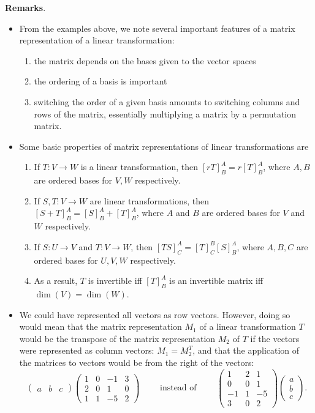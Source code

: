 \documentclass[12pt]{article}
\begin{document}
\textbf{Remarks}.  
\begin{itemize}
\item
From the examples above, we note several important features of a matrix representation of a linear transformation:
\begin{enumerate}
\item the matrix depends on the bases given to the vector spaces
\item the ordering of a basis is important
\item switching the order of a given basis amounts to switching columns and rows of the matrix, essentially multiplying a matrix by a permutation matrix.
\end{enumerate}
\item Some basic properties of matrix representations of linear transformations are
\begin{enumerate}
\item If $T:V\to W$ is a linear transformation, then $[rT]^A_B=r[T]^A_B$, where $A,B$ are ordered bases for $V,W$ respectively.
\item If $S,T:V\to W$ are linear transformations, then $[S+T]^A_B=[S]^A_B+[T]^A_B$, where $A$ and $B$ are ordered bases for $V$ and $W$ respectively.
\item If $S:U\to V$ and $T:V\to W$, then $[TS]^A_C=[T]^B_C[S]^A_B$, where $A,B,C$ are ordered bases for $U,V,W$ respectively.
\item As a result, $T$ is invertible iff $[T]^A_B$ is an invertible matrix iff $\dim(V)=\dim(W)$.
\end{enumerate}
\item
We could have represented all vectors as row vectors.  However, doing so would mean that the matrix representation $M_1$ of a linear transformation $T$ would be the transpose of the matrix representation $M_2$ of $T$ if the vectors were represented as column vectors: $M_1=M_2^T$, and that the application of the matrices to vectors would be from the right of the vectors:  $$\begin{pmatrix}a&b&c\end{pmatrix}\begin{pmatrix}1&0&-1&3\\2&0&1&0\\1&1&-5&2\end{pmatrix}\qquad \mbox{ instead of } \qquad\begin{pmatrix} 1&2&1 \\ 0&0&1 \\ -1&1&-5 \\ 3&0&2 \end{pmatrix}\begin{pmatrix}a\\b\\c\end{pmatrix}.$$
\end{itemize}
\end{document}
